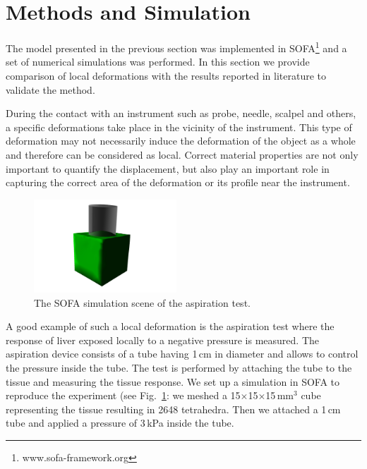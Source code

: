 \documentclass{acm_proc_article-sp}
\begin{document}
\section{Methods and Simulation} %
The model presented in the previous section was implemented in 
SOFA\footnote{www.sofa-framework.org} and a set of
numerical simulations was performed.
In this section we provide comparison of local deformations with the
results reported in literature to validate the method.

During the contact with an instrument such as probe, needle, scalpel and others,
a specific deformations take place in the vicinity of
the instrument. This type of deformation may not necessarily induce the
deformation of the object as a whole and therefore can be considered as
local. Correct material properties are not only important to quantify the
displacement, but also play an important role in capturing the correct area of
the deformation or its profile near the instrument.

\begin{figure}
  \centering
  \includegraphics[height=3.5cm]{aspiration.jpg}
  \caption{\label{fig-aspiration1} The SOFA simulation scene of the aspiration test.}
\end{figure}

A good example of such a local deformation is the aspiration test
where the response of liver exposed locally to a negative pressure is measured.
The aspiration device consists of a tube having 1\,cm in diameter and allows to
control the pressure inside the tube. The test is performed by
attaching the tube to the tissue and measuring the tissue response. We
set up a simulation in SOFA to reproduce the experiment (see
Fig.~\ref{fig-aspiration1}: we meshed a 15$\times$15$\times$15\,mm$^3$ 
cube representing the tissue resulting in 2648 tetrahedra. Then we attached a 1\,cm tube 
and applied a pressure of 3\,kPa inside the tube. 
\end{document}
